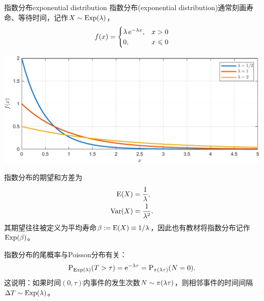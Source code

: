 \begin{definition}{指数分布}{exponential distribution}
	指数分布(exponential distribution)通常刻画寿命、等待时间，记作$X\sim\operatorname{Exp}(\lambda)$，
	\begin{equation}
		f(x)=\begin{cases}
			\lambda\mathop{}\!\mathrm{e}^{-\lambda x},&x>0\\
			0,&x\leqslant 0
		\end{cases}
	\end{equation}
	\begin{center}
		\includegraphics[width=.9\textwidth]{figures/pdf_exp.pdf}
	\end{center}
\end{definition}

\begin{corollary}
	指数分布的期望和方差为
	\begin{subequations}
		\begin{align}
			\operatorname{E}(X)&=\frac1\lambda,\\
			\operatorname{Var}(X)&=\frac1{\lambda^2}.
		\end{align}
	\end{subequations}
	其期望往往被定义为平均寿命$\beta:=\operatorname{E}(X)\equiv 1/\lambda$，因此也有教材将指数分布记作$\operatorname{Exp}(\beta)$。
\end{corollary}

\begin{corollary}
	指数分布的尾概率与Poisson分布有关：
	\[
		\operatorname{P}_{\operatorname{Exp}(\lambda)}(T>\tau)=\mathop{}\!\mathrm{e}^{-\lambda\tau}=\operatorname{P}_{\operatorname{\pi}(\lambda\tau)}(N=0).
	\]
	这说明：如果时间$(0,\tau)$内事件的发生次数$N\sim\operatorname{\pi}(\lambda\tau)$，则相邻事件的时间间隔$\Delta T\sim\operatorname{Exp}(\lambda)$。
\end{corollary}

